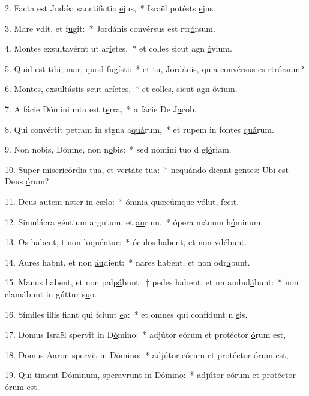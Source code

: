 2. Facta est Judǽa sanctifictio \uline{e}jus,~* Israël potésts \uline{e}jus.\par 
3. Mare vdit, et f\uline{u}git:~* Jordánis convérsus est rtr\uline{ó}rsum.\par 
4. Montes exsultavérnt ut ar\uline{í}etes,~* et colles sicut agn \uline{ó}vium.\par 
5. Quid est tibi, mar, quod fug\uline{í}sti:~* et tu, Jordánis, quia convérsus es rtr\uline{ó}rsum?\par 
6. Montes, exsultástis scut ar\uline{í}etes,~* et colles, sicut agn \uline{ó}vium.\par 
7. A fácie Dómini mta est t\uline{e}rra,~* a fácie De J\uline{a}cob.\par 
8. Qui convértit petram in stgna a\uline{quá}rum,~* et rupem in fontes \uline{quá}rum.\par 
9. Non nobis, Dómne, non n\uline{o}bis:~* sed nómini tuo d gl\uline{ó}riam.\par 
10. Super misericórdia tua, et vertáte t\uline{u}a:~* nequándo dicant gentes: Ubi est Deus \uline{ó}rum?\par 
11. Deus autem nster in c\uline{æ}lo:~* ómnia quæcúmque vólut, f\uline{e}cit.\par 
12. Simulácra géntium argntum, et \uline{au}rum,~* ópera mánum h\uline{ó}minum.\par 
13. Os habent, t non lo\uline{qué}ntur:~* óculos habent, et non vd\uline{é}bunt.\par 
14. Aures habnt, et non \uline{áu}dient:~* nares habent, et non odr\uline{á}bunt.\par 
15. Manus habent, et non pal\uline{pá}bunt:~† pedes habent, et nn ambul\uline{á}bunt:~* non clamábunt in gúttur s\uline{u}o.\par 
16. Símiles illis fiant qui fciunt \uline{e}a:~* et omnes qui confídunt n \uline{e}is.\par 
17. Domus Israël spervit in D\uline{ó}mino:~* adjútor eórum et protéctor \uline{ó}rum est,\par 
18. Domus Aaron spervit in D\uline{ó}mino:~* adjútor eórum et protéctor \uline{ó}rum est,\par 
19. Qui timent Dóminum, speravrunt in D\uline{ó}mino:~* adjútor eórum et protéctor \uline{ó}rum est.\par 
